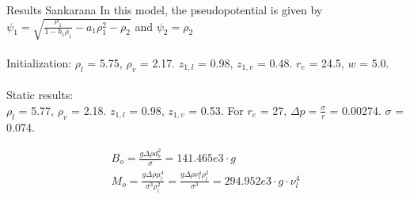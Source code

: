 \documentclass[8pt]{beamer}
\begin{document}
	\begin{frame}[t]{Results Sankarana}
		In this model, the pseudopotential is given by $\psi_1 = \sqrt{\frac{\rho_1}{1-b_1\rho_1}- a_1 \rho^2_1 - \rho_2}$ and $\psi_2 = \rho_2$\\~\\

		Initialization: $\rho_l$ = 5.75, $\rho_v$ = 2.17. $z_{1,l}$ = 0.98, $z_{1,v}$ = 0.48. $r_e$ = 24.5, $w$ = 5.0.\\~\\

		Static results:\\
		$\rho_l$ = 5.77, $\rho_v$ = 2.18. $z_{1,l}$ = 0.98, $z_{1,v}$ = 0.53. For $r_e$ = 27, $\Delta p = \frac{\sigma}{r}$ = 0.00274. $\sigma$ = 0.074.

		\begin{equation*}
			\begin{split}
			B_o = \frac{g \Delta \rho d_b^2}{\sigma} = 141.465e3 \cdot g\\
			M_o = \frac{g \Delta \rho \mu_l^4}{\sigma^3 \rho_l^2} = \frac{g \Delta \rho \nu_l^4 \rho_l^2}{\sigma^3} = 294.952e3 \cdot g \cdot \nu^4_l
			\end{split}
		\end{equation*}

	\end{frame}


	
\end{document}
